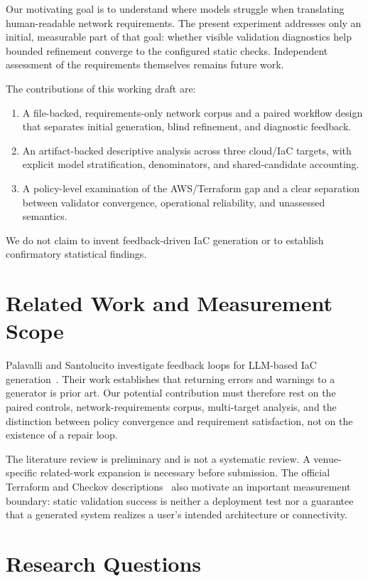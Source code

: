 \documentclass[11pt]{article}
\begin{document}
Our motivating goal is to understand where models struggle when translating
human-readable network requirements. The present experiment addresses only an
initial, measurable part of that goal: whether visible validation diagnostics
help bounded refinement converge to the configured static checks. Independent
assessment of the requirements themselves remains future work.

The contributions of this working draft are:
\begin{enumerate}
  \item A file-backed, requirements-only network corpus and a paired workflow
  design that separates initial generation, blind refinement, and diagnostic
  feedback.
  \item An artifact-backed descriptive analysis across three cloud/IaC targets,
  with explicit model stratification, denominators, and shared-candidate accounting.
  \item A policy-level examination of the AWS/Terraform gap and a clear separation
  between validator convergence, operational reliability, and unassessed semantics.
\end{enumerate}
We do not claim to invent feedback-driven IaC generation or to establish
confirmatory statistical findings.

\section{Related Work and Measurement Scope}
Palavalli and Santolucito investigate feedback loops for LLM-based IaC
generation~\cite{palavalli2024feedback}. Their work establishes that returning
errors and warnings to a generator is prior art. Our potential contribution must
therefore rest on the paired controls, network-requirements corpus, multi-target
analysis, and the distinction between policy convergence and requirement
satisfaction, not on the existence of a repair loop.

The literature review is preliminary and is not a systematic review. A
venue-specific related-work expansion is necessary before submission.
The official Terraform and Checkov descriptions~\cite{terraformvalidate,checkov}
also motivate an important measurement boundary: static validation success is
neither a deployment test nor a guarantee that a generated system realizes a
user's intended architecture or connectivity.

\section{Research Questions}
\end{document}
